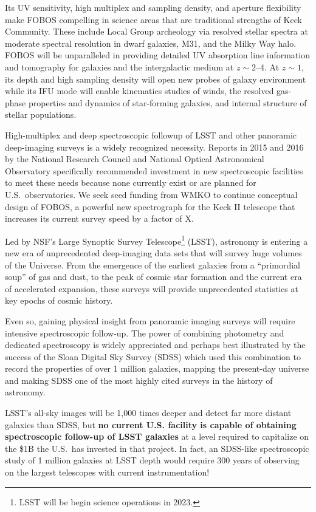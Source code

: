 Its UV sensitivity, high multiplex and sampling density, and aperture flexibility make FOBOS compelling in science
areas that are traditional strengths of Keck Community.  These include Local Group archeology via resolved stellar
spectra at moderate spectral resolution in dwarf galaxies, M31, and the Milky Way halo.   FOBOS will be unparalleled in
providing detailed UV absorption line information and tomography for galaxies and the intergalactic medium at $z \sim
2$--4.  At $z \sim 1$, its depth and high sampling density will open new probes of galaxy environment while its IFU mode will enable kinematics studies of winds, the resolved gas-phase properties and dynamics of star-forming galaxies, and internal structure of stellar populations.

High-multiplex and deep spectroscopic followup of LSST and other
panoramic deep-imaging surveys is a widely recognized necessity.
Reports in 2015 and 2016 by the National Research Council and
National Optical Astronomical Observatory specifically recommended
investment in new spectroscopic facilities to meet these needs
because none currently exist or are planned for U.S.\ observatories.
We seek seed funding from WMKO to continue conceptual design of
FOBOS, a powerful new spectrograph for the Keck II telescope that increases its current survey speed by a factor of X.

Led by NSF's Large Synoptic Survey Telescope\footnote{
%
LSST will be begin science operations in 2023.}
%
(LSST), astronomy is entering a new era of unprecedented deep-imaging data sets that will survey huge volumes of the
Universe.  From the emergence of the earliest galaxies from a ``primordial soup'' of gas and dust, to the peak of
cosmic star formation and the current era of accelerated expansion, these surveys will provide unprecedented statistics
at key epochs of cosmic history.


Even so, gaining physical insight from panoramic imaging surveys will require intensive spectroscopic follow-up.  The
power of combining photometry and dedicated spectroscopy is widely appreciated and perhaps best illustrated by the
success of the Sloan Digital Sky Survey (SDSS) which used this combination to record the properties of over 1 million
galaxies, mapping the present-day universe and making SDSS one of the most highly cited surveys in the history of
astronomy.

LSST's all-sky images will be 1,000 times deeper and detect far more
distant galaxies than SDSS, but \textbf{no current U.S. facility is
capable of obtaining spectroscopic follow-up of LSST galaxies} at a level
required to capitalize on the \$1B the U.S.\ has invested in that
project.  In fact, an SDSS-like spectroscopic study of 1 million
galaxies at LSST depth would require 300 years of observing on the
largest telescopes with current instrumentation!  


